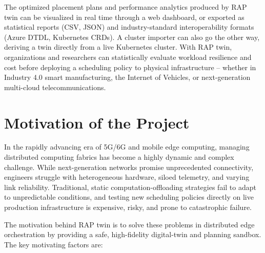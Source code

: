 \documentclass[12pt,a4]{report}
\begin{document}
The optimized placement plans and performance analytics produced by RAP twin can be visualized in real time through a web dashboard, or exported as statistical reports (CSV, JSON) and industry-standard interoperability formats (Azure DTDL, Kubernetes CRDs). A cluster importer can also go the other way, deriving a twin directly from a live Kubernetes cluster. With RAP twin, organizations and researchers can statistically evaluate workload resilience and cost before deploying a scheduling policy to physical infrastructure -- whether in Industry 4.0 smart manufacturing, the Internet of Vehicles, or next-generation multi-cloud telecommunications.

\section{Motivation of the Project}

In the rapidly advancing era of 5G/6G and mobile edge computing, managing distributed computing fabrics has become a highly dynamic and complex challenge. While next-generation networks promise unprecedented connectivity, engineers struggle with heterogeneous hardware, siloed telemetry, and varying link reliability. Traditional, static computation-offloading strategies fail to adapt to unpredictable conditions, and testing new scheduling policies directly on live production infrastructure is expensive, risky, and prone to catastrophic failure.

The motivation behind RAP twin is to solve these problems in distributed edge orchestration by providing a safe, high-fidelity digital-twin and planning sandbox. The key motivating factors are:
\end{document}
